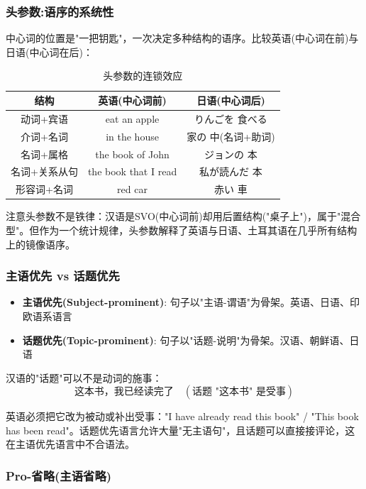 \subsubsection{头参数:语序的系统性}

中心词的位置是"一把钥匙"，一次决定多种结构的语序。比较英语(中心词在前)与日语(中心词在后)：

\begin{table}[H]
\centering
\caption{头参数的连锁效应}
\begin{tabulary}{\textwidth}{@{}CCC@{}}
\toprule
\textbf{结构} & \textbf{英语(中心词前)} & \textbf{日语(中心词后)} \\
\midrule
动词+宾语 & eat an apple & りんごを 食べる \\
介词+名词 & in the house & 家の 中(名词+助词) \\
名词+属格 & the book of John & ジョンの 本 \\
名词+关系从句 & the book that I read & 私が読んだ 本 \\
形容词+名词 & red car & 赤い 車 \\
\bottomrule
\end{tabulary}
\end{table}

注意头参数不是铁律：汉语是SVO(中心词前)却用后置结构("桌子上")，属于"混合型"。但作为一个统计规律，头参数解释了英语与日语、土耳其语在几乎所有结构上的镜像语序。

\subsubsection{主语优先 vs 话题优先}

\begin{itemize}
    \item \textbf{主语优先(Subject-prominent)}: 句子以"主语-谓语"为骨架。英语、日语、印欧语系语言
    \item \textbf{话题优先(Topic-prominent)}: 句子以"话题-说明"为骨架。汉语、朝鲜语、日语
\end{itemize}

汉语的"话题"可以不是动词的施事：
\begin{equation}
    \text{这本书，我已经读完了} \quad (\text{话题 "这本书" 是受事})
\end{equation}

英语必须把它改为被动或补出受事："I have already read this book" / "This book has been read"。话题优先语言允许大量"无主语句"，且话题可以直接接评论，这在主语优先语言中不合语法。

\subsubsection{Pro-省略(主语省略)}

